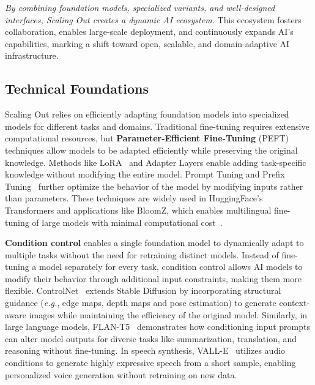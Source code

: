 \textit{By combining foundation models, specialized variants, and well-designed interfaces, Scaling Out creates a dynamic AI ecosystem.} This ecosystem fosters collaboration, enables large-scale deployment, and continuously expands AI’s capabilities, marking a shift toward open, scalable, and domain-adaptive AI infrastructure.

\subsection{Technical Foundations}
Scaling Out relies on efficiently adapting foundation models into specialized models for different tasks and domains. Traditional fine-tuning requires extensive computational resources, but \textbf{Parameter-Efficient Fine-Tuning} (PEFT) techniques allow models to be adapted efficiently while preserving the original knowledge. Methods like LoRA~\cite{hu2021lora} and Adapter Layers enable adding task-specific knowledge without modifying the entire model. Prompt Tuning and Prefix Tuning~\cite{li2021prefix} further optimize the behavior of the model by modifying inputs rather than parameters. These techniques are widely used in HuggingFace’s Transformers and applications like BloomZ, which enables multilingual fine-tuning of large models with minimal computational cost~\cite{muennighoff2022crosslingual}.

\textbf{Condition control} enables a single foundation model to dynamically adapt to multiple tasks without the need for retraining distinct models. Instead of fine-tuning a model separately for every task, condition control allows AI models to modify their behavior through additional input constraints, making them more flexible. ControlNet~\cite{zhang2023building} extends Stable Diffusion by incorporating structural guidance (\textit{e.g.}, edge maps, depth maps and pose estimation) to generate context-aware images while maintaining the efficiency of the original model. Similarly, in large language models, FLAN-T5~\cite{chung2024scaling} demonstrates how conditioning input prompts can alter model outputs for diverse tasks like summarization, translation, and reasoning without fine-tuning. In speech synthesis, VALL-E~\cite{wang2023neural} utilizes audio conditions to generate highly expressive speech from a short sample, enabling personalized voice generation without retraining on new data. 

